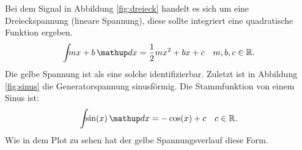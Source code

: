 Bei dem Signal in Abbildung \ref{fig:dreieck} handelt es sich um eine Dreieckspannung
(lineare Spannung),
diese sollte integriert eine quadratische Funktion ergeben.
\begin{equation*}
   \int\!\!\! mx+b \dv{x}= \frac{1}{2}mx^2+bx+c \quad m,b,c\in\mathbb{R}.
\end{equation*}
Die gelbe Spannung ist als eine solche identifizierbar.
Zuletzt ist in Abbildung \ref{fig:sinus} die Generatorspannung sinusförmig.
Die Stammfunktion von einem Sinus ist:
\begin{equation*}
  \int\!\!\! \sin(x)\dv{x}=-\cos(x)+c \quad c\in \mathbb{R}.
\end{equation*}
Wie in dem Plot zu sehen hat der gelbe Spannungsverlauf diese Form.
